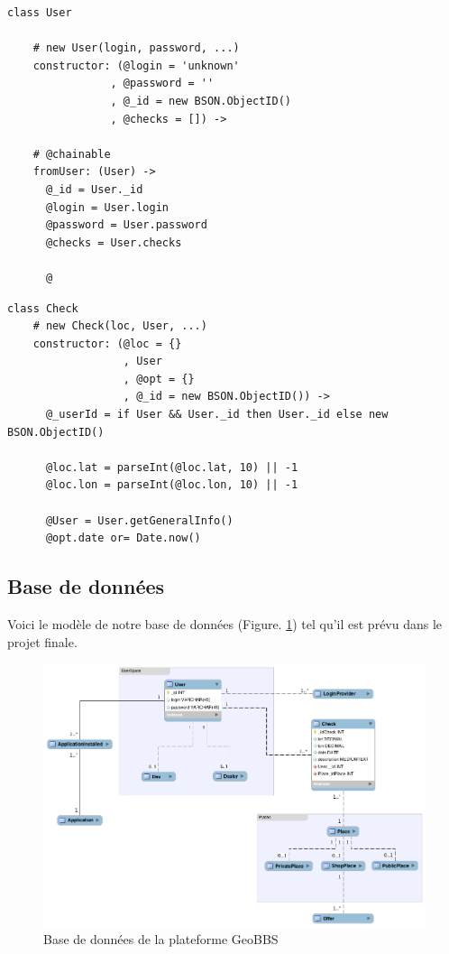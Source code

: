 \documentclass[a4paper,12pt]{report}
\begin{document}
\begin{onehalfspace}
\begin{lstlisting}[float=htb, frame=lines, caption={Model User}, label={code:modelUser}]
class User

    # new User(login, password, ...)
    constructor: (@login = 'unknown'
                , @password = ''
                , @_id = new BSON.ObjectID()
                , @checks = []) ->

    # @chainable
    fromUser: (User) ->
      @_id = User._id
      @login = User.login
      @password = User.password
      @checks = User.checks

      @
\end{lstlisting}

\begin{lstlisting}[float=htb, frame=lines, caption={Model Check}, label={code:modelCheck}]
class Check
    # new Check(loc, User, ...)
    constructor: (@loc = {}
                  , User
                  , @opt = {}
                  , @_id = new BSON.ObjectID()) ->
      @_userId = if User && User._id then User._id else new BSON.ObjectID()

      @loc.lat = parseInt(@loc.lat, 10) || -1
      @loc.lon = parseInt(@loc.lon, 10) || -1

      @User = User.getGeneralInfo()
      @opt.date or= Date.now()
\end{lstlisting}


\subsection{Base de données}
Voici le modèle de notre base de données (Figure. \ref{fig:amqp1}) tel qu'il est prévu dans le projet finale.

\begin{figure}[htb]
  \centering
  \includegraphics[width=\textwidth]{diagrameBDD/model.png}
  \caption{Base de données de la plateforme GeoBBS}
  \label{fig:amqp1}
\end{figure}


\end{onehalfspace}
\end{document}
